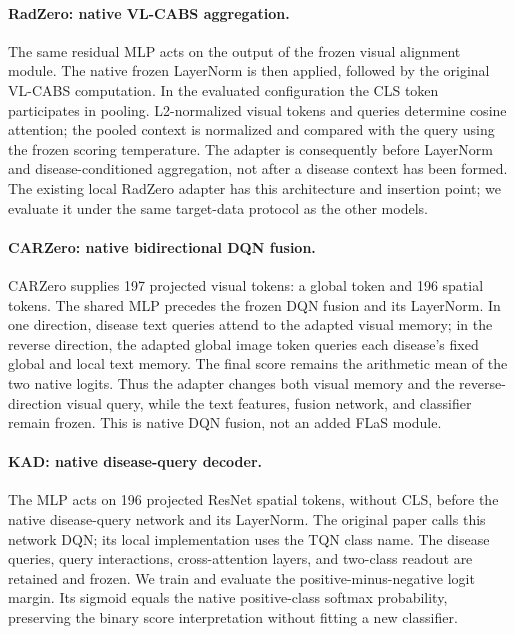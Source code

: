 \documentclass[10pt,twocolumn,letterpaper]{article}
\begin{document}
\paragraph{RadZero: native VL-CABS aggregation.}
The same residual MLP acts on the output of the frozen visual alignment module. The native frozen LayerNorm is then applied, followed by the original VL-CABS computation. In the evaluated configuration the CLS token participates in pooling. L2-normalized visual tokens and queries determine cosine attention; the pooled context is normalized and compared with the query using the frozen scoring temperature. The adapter is consequently before LayerNorm and disease-conditioned aggregation, not after a disease context has been formed. The existing local RadZero adapter has this architecture and insertion point; we evaluate it under the same target-data protocol as the other models.

\paragraph{CARZero: native bidirectional DQN fusion.}
CARZero supplies 197 projected visual tokens: a global token and 196 spatial tokens. The shared MLP precedes the frozen DQN fusion and its LayerNorm. In one direction, disease text queries attend to the adapted visual memory; in the reverse direction, the adapted global image token queries each disease's fixed global and local text memory. The final score remains the arithmetic mean of the two native logits. Thus the adapter changes both visual memory and the reverse-direction visual query, while the text features, fusion network, and classifier remain frozen. This is native DQN fusion, not an added FLaS module.

\paragraph{KAD: native disease-query decoder.}
The MLP acts on 196 projected ResNet spatial tokens, without CLS, before the native disease-query network and its LayerNorm. The original paper calls this network DQN; its local implementation uses the TQN class name. The disease queries, query interactions, cross-attention layers, and two-class readout are retained and frozen. We train and evaluate the positive-minus-negative logit margin. Its sigmoid equals the native positive-class softmax probability, preserving the binary score interpretation without fitting a new classifier.
\end{document}

